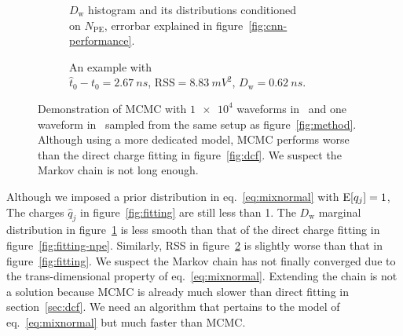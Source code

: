 \begin{figure}[H]
  \begin{subfigure}{.5\textwidth}
    \centering
    \resizebox{\textwidth}{!}{}
    \caption{\label{fig:mcmc-npe} $D_\mathrm{w}$ histogram and its distributions conditioned \\ on $N_{\mathrm{PE}}$, errorbar explained in figure~\ref{fig:cnn-performance}.}
  \end{subfigure}
  \begin{subfigure}{.5\textwidth}
    \centering
    \resizebox{\textwidth}{!}{}
    \caption{\label{fig:mcmc}An example with \\ $\hat{t}_0 - t_0=\SI{2.67}{ns}$, $\mathrm{RSS}=\SI{8.83}{mV^2}$, $D_\mathrm{w}=\SI{0.62}{ns}$.}
  \end{subfigure}
  \caption{\label{fig:mcmc-performance}Demonstration of MCMC with $\num[retain-unity-mantissa=false]{1e4}$ waveforms in~ and one waveform in~ sampled from the same setup as figure~\ref{fig:method}.  Although using a more dedicated model, MCMC performs worse than the direct charge fitting in figure~\ref{fig:dcf}. We suspect the Markov chain is not long enough.}
\end{figure}
Although we imposed a prior distribution in eq.~\eqref{eq:mixnormal} with $\operatorname{E}[q_j]=1$, The charges $\hat{q}_j$ in figure~\ref{fig:fitting} are still less than 1.  The $D_\mathrm{w}$ marginal distribution in figure~\ref{fig:mcmc-npe} is less smooth than that of the direct charge fitting in figure~\ref{fig:fitting-npe}.  Similarly, RSS in figure~\ref{fig:mcmc} is slightly worse than that in figure~\ref{fig:fitting}.  We suspect the Markov chain has not finally converged due to the trans-dimensional property of eq.~\eqref{eq:mixnormal}.  Extending the chain is not a solution because MCMC is already much slower than direct fitting in section~\ref{sec:dcf}.  We need an algorithm that pertains to the model of eq.~\eqref{eq:mixnormal} but much faster than MCMC.

